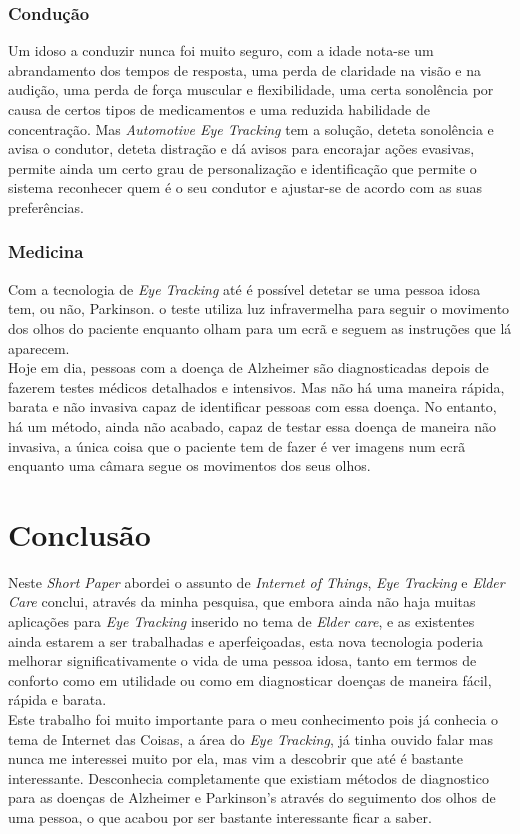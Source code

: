 \documentclass{llncs}
\begin{document}
\subsubsection{Condução}
Um idoso a conduzir nunca foi muito seguro, com a idade nota-se um abrandamento dos tempos de resposta, uma perda de claridade na visão e na audição, uma perda de força muscular e flexibilidade, uma certa sonolência por causa de certos tipos de medicamentos e uma reduzida habilidade de concentração. \cite{onl8} Mas \textit{Automotive Eye Tracking} tem a solução, deteta sonolência e avisa o condutor, deteta distração e dá avisos para encorajar ações evasivas, permite ainda um certo grau de personalização e identificação que permite o sistema reconhecer quem é o seu condutor e ajustar-se de acordo com as suas preferências. \cite{onl9}

\subsubsection{Medicina}
Com a tecnologia de \textit{Eye Tracking} até é possível detetar se uma pessoa idosa tem, ou não, Parkinson. o teste utiliza luz infravermelha para seguir o movimento dos olhos do paciente enquanto olham para um ecrã e seguem as instruções que lá aparecem. \cite{onl10} \\
\indent Hoje em dia, pessoas com a doença de Alzheimer são diagnosticadas depois de fazerem testes médicos detalhados e intensivos. Mas não há uma maneira rápida, barata e não invasiva capaz de identificar pessoas com essa doença. No entanto, há um método, ainda não acabado, capaz de testar essa doença de maneira não invasiva, a única coisa que o paciente tem de fazer é ver imagens num ecrã enquanto uma câmara segue os movimentos dos seus olhos.\cite{onl11}

\newpage


\section{Conclusão}
Neste \textit{Short Paper} abordei o assunto de \textit{Internet of Things}, \textit{Eye Tracking} e \textit{Elder Care} conclui, através da minha pesquisa, que embora ainda não haja muitas aplicações para \textit{Eye Tracking} inserido no tema de \textit{Elder care}, e as existentes ainda estarem a ser trabalhadas e aperfeiçoadas, esta nova tecnologia poderia melhorar significativamente o vida de uma pessoa idosa, tanto em termos de conforto como em utilidade ou como em diagnosticar doenças de maneira fácil, rápida e barata. \\
\indent Este trabalho foi muito importante para o meu conhecimento pois já conhecia o tema de Internet das Coisas, a área do \textit{Eye Tracking}, já tinha ouvido falar mas nunca me interessei muito por ela, mas vim a descobrir que até é bastante interessante. Desconhecia completamente que existiam métodos de diagnostico para as doenças de Alzheimer e Parkinson's através do seguimento dos olhos de uma pessoa, o que acabou por ser bastante interessante ficar a saber.

\newpage





\nocite{*}
\end{document}
